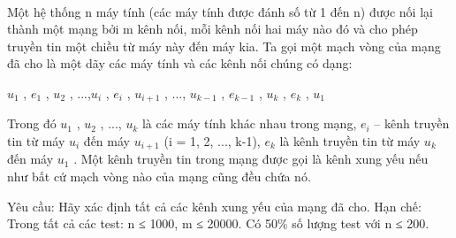  

Một hệ thống n máy tính (các máy tính được đánh số từ 1 đến n) được nối lại thành một mạng bởi m kênh nối, mỗi kênh nối hai máy nào đó và cho phép truyền tin một chiều từ máy này đến máy kia. Ta gọi một mạch vòng của mạng đã cho là một dãy các máy tính và các kênh nối chúng có dạng:

$u_{1}$ , $e_{1}$ , $u_{2}$ , ...,$u_{i}$ , $e_{i}$ , $u_{i+1}$ , ..., $u_{k-1}$ , $e_{k-1}$ , $u_{k}$ , $e_{k}$ , $u_{1}$

Trong đó $u_{1}$ , $u_{2}$ , ..., $u_{k}$ là các máy tính khác nhau trong mạng, $e_{i}$ – kênh truyền tin từ máy $u_{i}$ đến máy $u_{i+1}$ (i = 1, 2, ..., k-1), $e_{k}$ là kênh truyền tin từ máy $u_{k}$ đến máy $u_{1}$ . Một kênh truyền tin trong mạng được gọi là kênh xung yếu nếu như bất cứ mạch vòng nào của mạng cũng đều chứa nó.

Yêu cầu: Hãy xác định tất cả các kênh xung yếu của mạng đã cho.
Hạn chế:
Trong tất cả các test: n ≤ 1000, m ≤ 20000. Có 50\% số lượng test với n ≤ 200.